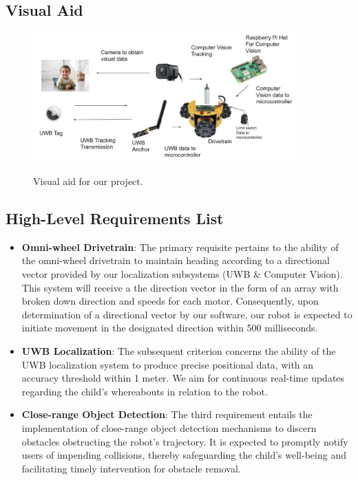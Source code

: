 \documentclass[journal,onecolumn, draftclsnofoot, 12pt]{IEEEtran}
\begin{document}
\subsection{Visual Aid}

\begin{figure}[H]
\begin{center}
\includegraphics[width=0.9\textwidth]{VisualAid.png}\\
\caption{ Visual aid for our project.  } 
\label{fig:visualaid}
\end{center}
\end{figure}

\newpage

\subsection{High-Level Requirements List}
\begin{itemize}
    \item \textbf{Omni-wheel Drivetrain}: 
    The primary requisite pertains to the ability of the omni-wheel drivetrain to maintain heading according to a directional vector provided by our localization subsystems (UWB \& Computer Vision). This system will receive a the direction vector in the form of an array with broken down direction and speeds for each motor. Consequently, upon determination of a directional vector by our software, our robot is expected to initiate movement in the designated direction within 500 milliseconds.

    \item \textbf{UWB Localization}: 
    The subsequent criterion concerns the ability of the UWB localization system to produce precise positional data, with an accuracy threshold within 1 meter. We aim for continuous real-time updates regarding the child's whereabouts in relation to the robot.
    
    \item \textbf{Close-range Object Detection}: 
    The third requirement entails the implementation of close-range object detection mechanisms to discern obstacles obstructing the robot's trajectory. It is expected to promptly notify users of impending collisions, thereby safeguarding the child's well-being and facilitating timely intervention for obstacle removal.
    
\end{itemize}
\end{document}
